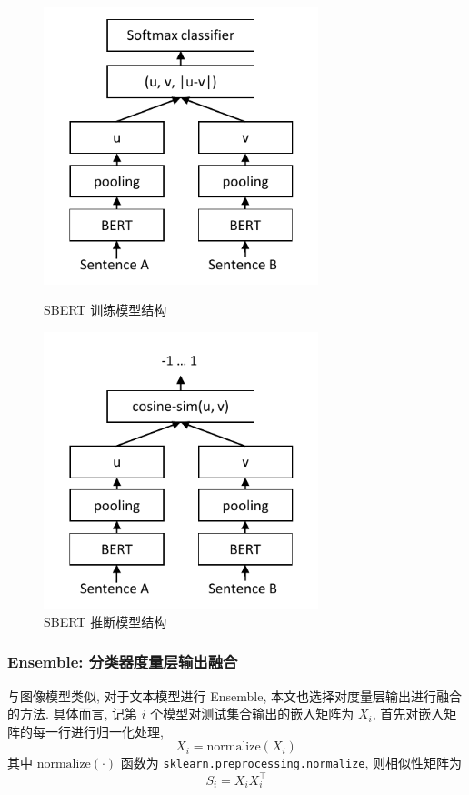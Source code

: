 \documentclass[12pt]{article}
\begin{document}
\begin{figure}[htbp]
  \centering
  \begin{minipage}[t]{0.48\textwidth}
    \centering
    \includegraphics[width=8cm]{SBERT_Architektur.pdf}
    \caption{SBERT 训练模型结构}
    \label{fig:sbert_train}
  \end{minipage}
  \begin{minipage}[t]{0.48\textwidth}
    \centering
    \includegraphics[width=8cm]{SBERT_Architektur_cosine.pdf}
    \caption{SBERT 推断模型结构}
    \label{fig:sbert_inference}
  \end{minipage}
\end{figure}

\subsubsection{Ensemble: 分类器度量层输出融合}

与图像模型类似, 对于文本模型进行 Ensemble, 本文也选择对度量层输出进行融合的方法. 具体而言, 记第 $i$ 个模型对测试集合输出的嵌入矩阵为 $X_i$, 首先对嵌入矩阵的每一行进行归一化处理, 
\begin{equation}
  X_i = \text{normalize}(X_i)
\end{equation}
其中 $\text{normalize}(\cdot)$ 函数为 \verb|sklearn.preprocessing.normalize|, 则相似性矩阵为
\begin{equation}
  S_i = X_iX_i^\top
\end{equation}
\end{document}
